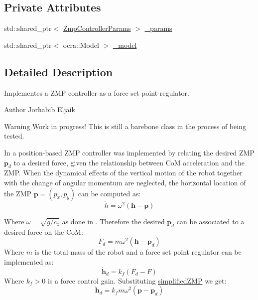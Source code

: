 \subsection*{Private Attributes}
\begin{DoxyCompactItemize}
\item 
std\+::shared\+\_\+ptr$<$ \hyperlink{structZmpControllerParams}{Zmp\+Controller\+Params} $>$ \hyperlink{classZmpController_a59a45aafc8a49a0d49966f7ed061a022}{\+\_\+params}
\item 
std\+::shared\+\_\+ptr$<$ ocra\+::\+Model $>$ \hyperlink{classZmpController_ac86a58d1f870ce27c78b0f6d2294e05f}{\+\_\+model}
\end{DoxyCompactItemize}


\subsection{Detailed Description}
Implementes a Z\+MP controller as a force set point regulator. 

\begin{DoxyAuthor}{Author}
Jorhabib Eljaik
\end{DoxyAuthor}
\cite{krause2012stabilization}

\begin{DoxyWarning}{Warning}
Work in progress! This is still a barebone class in the process of being tested.
\end{DoxyWarning}
In \cite{krause2012stabilization} a position-\/based Z\+MP controller was implemented by relating the desired Z\+MP $ \mathbf{p}_d $ to a desired force, given the relationship between CoM acceleration and the Z\+MP. When the dynamical effects of the vertical motion of the robot together with the change of angular momentum are neglected, the horizontal location of the Z\+MP $\mathbf{p} = (p_x, p_y)$ can be computed as\+: \label{classZmpController_simplifiedZMP}%
\hypertarget{classZmpController_simplifiedZMP}{}%
 \begin{equation} \ddot{h} = \omega^2(\mathbf{h} - \mathbf{p}) \end{equation}

Where $\omega = \sqrt{g/c_z}$ as done in \cite{kajita2003biped}. Therefore the desired $\mathbf{p}_d$ can be associated to a desired force on the CoM\+: \[ F_d = m \omega^2 (\mathbf{h} - \mathbf{p}_d) \] Where $m$ is the total mass of the robot and a force set point regulator can be implemented as\+: \[ \dot{\mathbf{h}}_d = k_f(F_d - F) \] Where $k_f > 0$ is a force control gain. Substituting \hyperlink{classZmpController_simplifiedZMP}{simplified\+Z\+MP} we get\+: \[ \dot{\mathbf{h}}_d = k_f m \omega^2(\mathbf{p} - \mathbf{p}_d) \]

